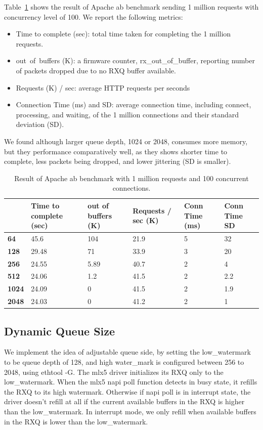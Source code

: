 \documentclass[letterpaper]{article}
\begin{document}
Table~\ref{tab:ab1} shows the result of Apache ab benchmark sending 1 million requests
with concurrency level of 100. We report the following metrics:
\begin{itemize}
    \item Time to complete (sec): total time taken for completing the 1 million requests.
    \item out\ of\ buffers (K): a firmware counter, rx\_out\_of\_buffer, reporting number of packets dropped due to no RXQ buffer available.
    \item Requests (K) / sec: average HTTP requests per seconds
    \item Connection Time (ms) and SD: average connection time, including connect, processing, and waiting, of the 1 million connections and their standard deviation (SD).
\end{itemize}
We found although larger queue depth, 1024 or 2048, consumes more memory, but they
performance comparatively well, as they shows shorter time to complete, less packets
being dropped, and lower jittering (SD is smaller).

\begin{table}[h!]
\centering
\footnotesize
\begin{tabular}{|p{0.6cm}|p{1.2cm}|p{1.2cm}|p{1.2cm}|p{0.8cm}|p{1cm}|} \hline
\textbf{} & \textbf{Time to complete (sec)} & \textbf{out of buffers (K)} & \textbf{Requests / sec (K)} & \textbf{Conn Time (ms)} & \textbf{Conn Time SD} \\ \hline \hline
\textbf{64}   & 45.6  & 104   & 21.9 & 5 & 32  \\ \hline
\textbf{128}  & 29.48 & 71    & 33.9 & 3 & 20  \\ \hline \hline
\textbf{256}  & 24.55 & 5.89  & 40.7 & 2 & 4   \\ \hline
\textbf{512}  & 24.06 & 1.2   & 41.5 & 2 & 2.2 \\ \hline
\textbf{1024} & 24.09 & 0     & 41.5 & 2 & 1.9 \\ \hline
\textbf{2048} & 24.03 & 0     & 41.2 & 2 & 1   \\ \hline
\end{tabular}
\caption{Result of Apache ab benchmark with 1 million requests and 100 concurrent connections.}
\label{tab:ab1}
\end{table}


\subsection{Dynamic Queue Size}
We implement the idea of adjustable queue side, by setting the low\_watermark to
be queue depth of 128, and high water\_mark is configured between 256 to 2048, using
ethtool -G. The mlx5 driver initializes its RXQ only to the low\_watermark.
When the mlx5 napi poll function detects in busy state, it refills the
RXQ to its high watermark. Otherwise if napi poll is in interrupt state, the driver
doesn't refill at all if the current available buffers in the RXQ is higher than
the low\_watermark. In interrupt mode, we only refill when available buffers in the RXQ
is lower than the low\_watermark.
\end{document}
